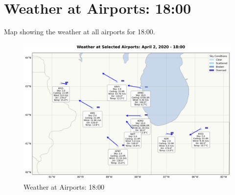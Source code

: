 \section{Weather at Airports: 18:00}
Map showing the weather at all airports for 18:00.
\begin{figure}[htbp]
\centering
\includegraphics[width=0.7	extwidth]{weather_map_18_00.png}
\caption{Weather at Airports: 18:00}
\label{fig:weather_map_18_00}
\end{figure}
